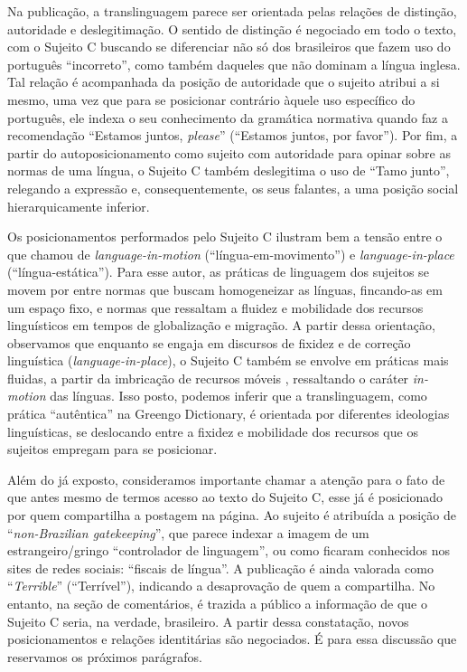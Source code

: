 \documentclass[portuguese]{textolivre}
\begin{document}
Na publicação, a translinguagem parece ser orientada pelas relações de distinção, autoridade e deslegitimação. O sentido de distinção é negociado em todo o texto, com o Sujeito C buscando se diferenciar não só dos brasileiros que fazem uso do português “incorreto”, como também daqueles que não dominam a língua inglesa. Tal relação é acompanhada da posição de autoridade que o sujeito atribui a si mesmo, uma vez que para se posicionar contrário àquele uso específico do português, ele indexa o seu conhecimento da gramática normativa quando faz a recomendação “Estamos juntos, \textit{please}” (“Estamos juntos, por favor”). Por fim, a partir do autoposicionamento como sujeito com autoridade para opinar sobre as normas de uma língua, o Sujeito C também deslegitima o uso de “Tamo junto”, relegando a expressão e, consequentemente, os seus falantes, a uma posição social hierarquicamente inferior.	

Os posicionamentos performados pelo Sujeito C ilustram bem a tensão entre o que \textcite{blommaert_sociolinguistics_2010} chamou de \textit{language-in-motion} (“língua-em-movimento”) e \textit{language-in-place} (“língua-estática”). Para esse autor, as práticas de linguagem dos sujeitos se movem por entre normas que buscam homogeneizar as línguas, fincando-as em um espaço fixo, e normas que ressaltam a fluidez e mobilidade dos recursos linguísticos em tempos de globalização e migração. A partir dessa orientação, observamos que enquanto se engaja em discursos de fixidez e de correção linguística (\textit{language-in-place}), o Sujeito C também se envolve em práticas mais fluidas, a partir da imbricação de recursos móveis \cite{blommaert_sociolinguistics_2010}, ressaltando o caráter \textit{in-motion} das línguas. Isso posto, podemos inferir que a translinguagem, como prática “autêntica” na Greengo Dictionary, é orientada por diferentes ideologias linguísticas, se deslocando entre a fixidez e mobilidade dos recursos que os sujeitos empregam para se posicionar.

Além do já exposto, consideramos importante chamar a atenção para o fato de que antes mesmo de termos acesso ao texto do Sujeito C, esse já é posicionado por quem compartilha a postagem na página. Ao sujeito é atribuída a posição de “\textit{non-Brazilian gatekeeping}”, que parece indexar a imagem de um estrangeiro/gringo “controlador de linguagem”, ou como ficaram conhecidos nos sites de redes sociais: “fiscais de língua”. A publicação é ainda valorada como “\textit{Terrible}” (“Terrível”), indicando a desaprovação de quem a compartilha. No entanto, na seção de comentários, é trazida a público a informação de que o Sujeito C seria, na verdade, brasileiro. A partir dessa constatação, novos posicionamentos e relações identitárias são negociados. É para essa discussão que reservamos os próximos parágrafos.
\end{document}
